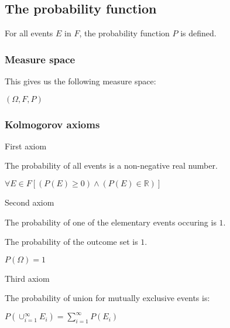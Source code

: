 
\subsection{The probability function}

For all events \(E\) in \(F\), the probability function \(P\) is defined.

\subsubsection{Measure space}

This gives us the following measure space:

\((\Omega, F, P)\)

\subsubsection{Kolmogorov axioms}

First axiom

The probability of all events is a non-negative real number.

\(\forall E \in F [(P(E)\ge 0)\land (P(E)\in \mathbb{R})]\)

Second axiom

The probability of one of the elementary events occuring is \(1\).

The probability of the outcome set is \(1\).

\(P(\Omega )=1\)

Third axiom

The probability of union for mutually exclusive events is:

\(P(\cup^\infty_{i=1}E_i)=\sum_{i=1}^\infty P(E_i)\)

